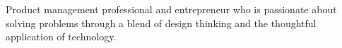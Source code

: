

\begin{cvparagraph}

Product management professional and entrepreneur who is passionate about solving problems through a blend of design thinking and the thoughtful application of technology.
\end{cvparagraph}




